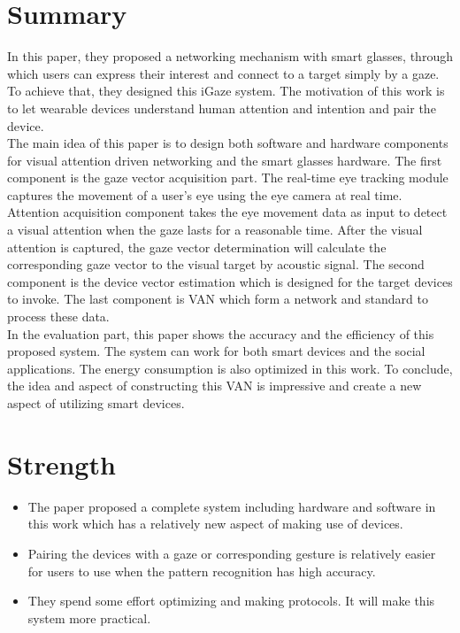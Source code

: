 \documentclass{article}
\begin{document}
\newcommand{\lfront}{\fontsize{17.28pt}{\baselineskip}\selectfont}
\newcommand{\mfront}{\fontsize{12pt}{\baselineskip}\selectfont}
\newcommand{\sfront}{\fontsize{9pt}{\baselineskip}\selectfont}
\fancyhead[L]{\sfront{Zhe Yan 109241227}}
\fancyhead[R]{\sfront{\today}}
\begin{center}
\lfront{\textbf{Review of iGaze}}
\end{center}

\section{Summary}
\qquad In this paper, they proposed a networking mechanism with smart glasses, through which users can express their interest and connect to a target simply by a gaze. To achieve that, they designed this iGaze system. The motivation of this work is to let wearable devices understand human attention and intention and pair the device.  \\

\indent The main idea of this paper is to design both software and hardware components for visual attention driven networking and the smart glasses hardware. The first component is the gaze vector acquisition part. The real-time eye tracking module captures the movement of a user's eye using the eye camera at real time. Attention acquisition component takes the eye movement data  as input to detect a visual attention when the gaze lasts for a reasonable time. After the visual attention is captured, the gaze vector determination will calculate the corresponding gaze vector to the visual target by acoustic signal. The second component is the device vector estimation which is designed for the target devices to invoke. The last component is VAN which form a network and standard to process these data.\\

\indent In the evaluation part, this paper shows the accuracy and the efficiency of this proposed system. The system can work for both smart devices and the social applications. The energy consumption is also optimized in this work. To conclude, the idea and aspect of constructing this VAN is impressive and create a new aspect of utilizing smart devices.

\section{Strength}
\begin{itemize}
\item The paper proposed a complete system including hardware and software in this work which has a relatively new aspect of making use of devices.
\item Pairing the devices with a gaze or corresponding gesture is relatively easier for users to use when the pattern recognition has high accuracy.
\item They spend some effort optimizing and making protocols. It will make this system more practical.
\end{itemize}
\end{document}
